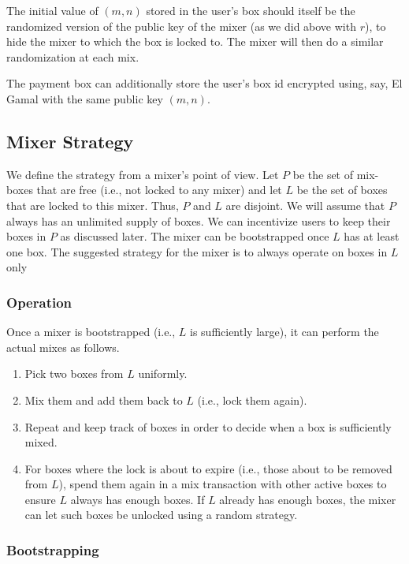 \documentclass[runningheads]{llncs}
\begin{document}
The initial value of $(m, n)$ stored in the user's box should itself be the randomized version of the public key of the mixer (as we did above with $r$), to hide the mixer to which the box is locked to. The mixer will then do a similar randomization at each mix.

The payment box can additionally store the user's box id encrypted using, say, El Gamal with the same public key $(m, n)$.



\subsection{Mixer Strategy}

We define the strategy from a mixer's point of view. Let $P$ be the set of mix-boxes that are free (i.e., not locked to any mixer) and let $L$ be the set of boxes that are locked to this mixer. Thus, $P$ and $L$ are disjoint. We will assume that $P$ always has an unlimited supply of boxes. We can incentivize users to keep their boxes in $P$ as discussed later. The mixer can be bootstrapped once $L$ has at least one box. The suggested strategy for the mixer is to always operate on boxes in $L$ only

\subsubsection{Operation}

Once a mixer is bootstrapped (i.e., $L$ is sufficiently large), it can perform the actual mixes as follows.
\begin{enumerate}
\item Pick two boxes from $L$ uniformly.
\item Mix them and add them back to $L$ (i.e., lock them again).
\item Repeat and keep track of boxes in order to decide when a box is sufficiently mixed.
\item For boxes where the lock is about to expire (i.e., those about to be removed from $L$),
spend them again in a mix transaction with other active boxes to ensure $L$ always has enough boxes.
If $L$ already has enough boxes, the mixer can let such boxes be unlocked using a random strategy.

\end{enumerate}

\subsubsection{Bootstrapping}
\end{document}
